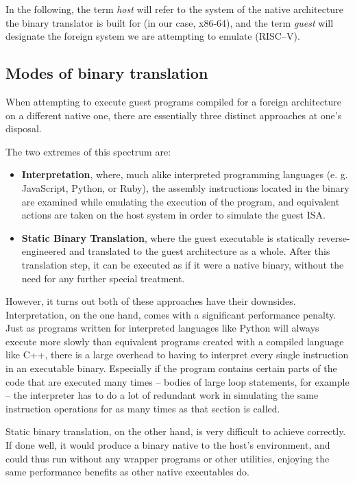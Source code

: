 In the following, the term \textit{host} will refer to the system of the native architecture the binary translator is built for (in our case, x86-64), and the term \textit{guest} will designate the foreign system we are attempting to emulate (RISC--V).


\subsection{Modes of binary translation}

When attempting to execute guest programs compiled for a foreign architecture on a different native one, there are essentially three distinct approaches at one's disposal.

The two extremes of this spectrum are:
\begin{itemize}
	\item \textbf{Interpretation}, where, much alike interpreted programming languages (e. g. JavaScript, Python, or Ruby), the assembly instructions located in the binary are examined while emulating the execution of the program, and equivalent actions are taken on the host system in order to simulate the guest ISA.
	\item \textbf{Static Binary Translation}, where the guest executable is statically reverse-engineered and translated to the guest architecture as a whole.
	After this translation step, it can be executed as if it were a native binary, without the need for any further special treatment.
\end{itemize}

However, it turns out both of these approaches have their downsides.
Interpretation, on the one hand, comes with a significant performance penalty.
Just as programs written for interpreted languages like Python will always execute more slowly than equivalent programs created with a compiled language like C++, there is a large overhead to having to interpret every single instruction in an executable binary.
Especially if the program contains certain parts of the code that are executed many times -- bodies of large loop statements, for example -- the interpreter has to do a lot of redundant work in simulating the same instruction operations for as many times as that section is called.

Static binary translation, on the other hand, is very difficult to achieve correctly.
If done well, it would produce a binary native to the host's environment, and could thus run without any wrapper programs or other utilities, enjoying the same performance benefits as other native executables do.

